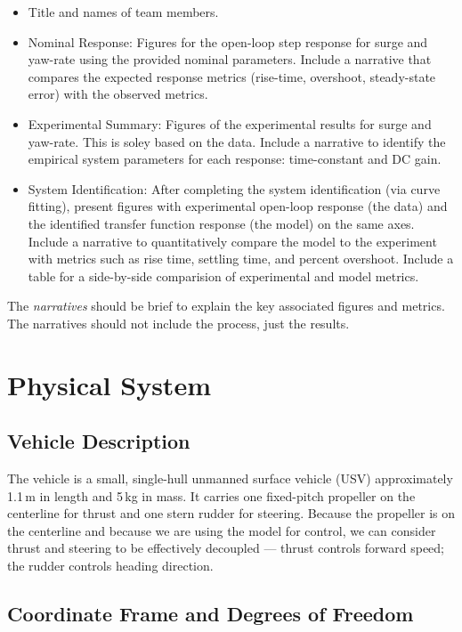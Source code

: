 \documentclass[11pt]{article}
\begin{document}
\begin{itemize}
  \item Title and names of team members.
  \item Nominal Response: Figures for the open-loop step response for surge and yaw-rate using the provided nominal parameters.  Include a narrative that compares the expected response metrics (rise-time, overshoot, steady-state error) with the observed metrics.
  \item Experimental Summary: Figures of the experimental results for surge and yaw-rate.   This is soley based on the data.  Include a narrative to identify the empirical system parameters for each response: time-constant and DC gain.
  \item System Identification: After completing the system identification (via curve fitting), present figures with experimental open-loop response (the data) and the identified transfer function response (the model) on the same axes.  Include a narrative to quantitatively compare the model to the experiment with metrics such as rise time, settling time, and percent overshoot.  Include a table for a side-by-side comparision of experimental and model metrics.
\end{itemize}

The \emph{narratives} should be brief to explain the key associated figures and metrics.  The narratives should not include the process, just the results.

\section{Physical System}

\subsection{Vehicle Description}

The vehicle is a small, single-hull unmanned surface vehicle (USV)
approximately 1.1\,m in length and 5\,kg in mass.  It carries one
fixed-pitch propeller on the centerline for thrust and one stern rudder
for steering.  Because the propeller is on the centerline and because we are using the model for control, we can consider thrust and
steering to be effectively decoupled --- thrust controls forward speed;
the rudder controls heading direction.

\subsection{Coordinate Frame and Degrees of Freedom}
\end{document}

